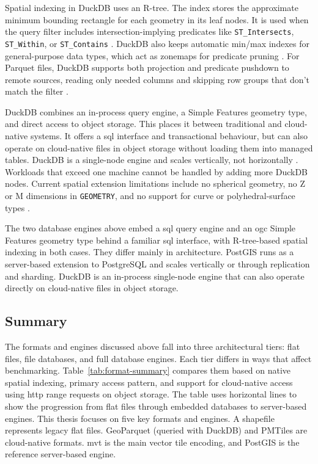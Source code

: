 {\sloppy
Spatial indexing in DuckDB uses an R-tree. The index stores the approximate minimum bounding rectangle for each geometry in its leaf nodes. It is used when the query filter includes intersection-implying predicates like \texttt{ST\_Intersects}, \texttt{ST\_Within}, or \texttt{ST\_Contains} \parencite{duckdb2025_spatial_extension_rtree_indexes}. DuckDB also keeps automatic min/max indexes for general-purpose data types, which act as zonemaps for predicate pruning \parencite{duckdb2025_documentation_indexes}. For Parquet files, DuckDB supports both projection and predicate pushdown to remote sources, reading only needed columns and skipping row groups that don't match the filter \parencite{duckdb2025_parquet_overview, duckdb2025_documentation_httpfs}.
\par}

DuckDB combines an in-process query engine, a Simple Features geometry type, and direct access to object storage. This places it between traditional and cloud-native systems. It offers a \acrshort{sql} interface and transactional behaviour, but can also operate on cloud-native files in object storage without loading them into managed tables. DuckDB is a single-node engine and scales vertically, not horizontally \parencite{duckdb2025_scalability_faq}. Workloads that exceed one machine cannot be handled by adding more DuckDB nodes. Current spatial extension limitations include no spherical geometry, no Z or M dimensions in \texttt{GEOMETRY}, and no support for curve or polyhedral-surface types \parencite{gabrielsson2023_postgeese_duckdb_spatial_extension, duckdb2025_spatial_extension_overview}.

The two database engines above embed a \acrshort{sql} query engine and an \acrshort{ogc} Simple Features geometry type behind a familiar \acrshort{sql} interface, with R-tree-based spatial indexing in both cases. They differ mainly in architecture. PostGIS runs as a server-based extension to PostgreSQL and scales vertically or through replication and sharding. DuckDB is an in-process single-node engine that can also operate directly on cloud-native files in object storage.

\subsection{Summary}
\label{sec:formats-summary}

The formats and engines discussed above fall into three architectural tiers: flat files, file databases, and full database engines. Each tier differs in ways that affect benchmarking. Table~\ref{tab:format-summary} compares them based on native spatial indexing, primary access pattern, and support for cloud-native access using \acrshort{http} range requests on object storage. The table uses horizontal lines to show the progression from flat files through embedded databases to server-based engines. This thesis focuses on five key formats and engines. A shapefile represents legacy flat files. GeoParquet (queried with DuckDB) and PMTiles are cloud-native formats. \acrshort{mvt} is the main vector tile encoding, and PostGIS is the reference server-based engine.

